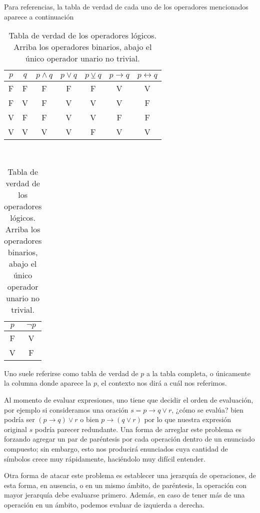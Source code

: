 \documentclass{book}
\theoremstyle{definition}
\begin{document}
Para referencias, la tabla de verdad de cada uno de los operadores mencionados aparece a continuación
\begin{table}[h]
\begin{center}\begin{tabular}{|c|c||c|c|c|c|c|}
	\hline 
	$p$& $q$ & $p \wedge q $ & $p \vee q$  & $p \veebar q $ & $p \rightarrow q$ & $p \leftrightarrow q$  \\
	\hline \hline
	F & F & F & F & F & V & V \\
	\hline
	F & V & F & V & V & V & F \\
	\hline
	V & F & F & V & V & F & F \\
	\hline
	V & V & V & V & F & V & V \\
	\hline
\end{tabular}\\
\begin{tabular}{|c||c|}
	\hline
	$p$ & $\neg p$ \\
	\hline \hline
	F & V \\
	\hline
	V & F \\
	\hline
\end{tabular}
\end{center}
\caption{Tabla de verdad de los operadores lógicos. Arriba los operadores binarios, abajo el único operador unario no trivial.}
\label{tb_tablaVerdadOperadores}
\end{table}

Uno suele referirse como tabla de verdad de $p$ a la tabla completa, o únicamente la columna donde aparece la $p$, el contexto nos dirá a cuál nos referimos.

Al momento de evaluar expresiones, uno tiene que decidir el orden de evaluación, por ejemplo si consideramos una oración $s=p\rightarrow q \vee r$, ¿cómo se evalúa? bien podría ser $(p\rightarrow q) \vee r$ o bien $p\rightarrow (q \vee r)$ por lo que nuestra expresión original $s$ podría parecer redundante. Una forma de arreglar este problema es forzando agregar un par de paréntesis por cada operación dentro de un enunciado compuesto; sin embargo, esto nos producirá enunciados cuya cantidad de símbolos crece muy rápidamente, haciéndolo muy difícil entender.

Otra forma de atacar este problema es establecer una jerarquía de operaciones, de esta forma, en ausencia, o en un mismo ámbito, de paréntesis, la operación con mayor jerarquía debe evaluarse primero.
Además, en caso de tener más de una operación en un ámbito, podemos evaluar de izquierda a derecha.
\end{document}
